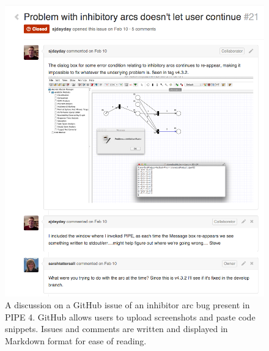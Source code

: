 \begin{figure}[tb]
\begin{center}
    \includegraphics[width=\linewidth]{build/gh_issues_discussion.png} 
    \caption{A discussion on a GitHub issue of an inhibitor arc bug present in PIPE 4. GitHub allows users to upload screenshots and paste code snippets. Issues and comments are written and displayed in Markdown format for ease of reading.}
    \label{fig:issue_discussion}
\end{center}
\end{figure}
\normallinespacing

